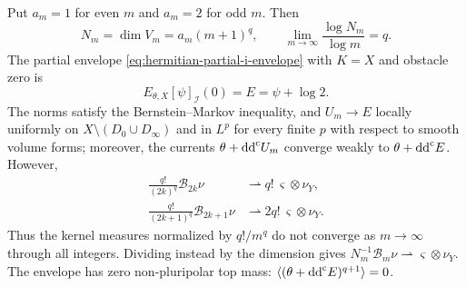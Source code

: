 \begin{theorem}\label{thm:ideal-rounding-kernel-limits}
Put $a_m=1$ for even $m$ and $a_m=2$ for odd $m$. Then
\[
 N_m=\dim V_m=a_m(m+1)^q,\qquad
 \lim_{m\to\infty}\frac{\log N_m}{\log m}=q.
\]
The partial envelope \eqref{eq:hermitian-partial-i-envelope} with $K=X$ and obstacle zero is
\begin{equation}\label{eq:critical-ideal-envelope}
 E_{\theta,X}[\psi]_{\mathcal I}(0)=E=\psi+\log2.
\end{equation}
The norms satisfy the Bernstein--Markov inequality, and $U_m\to E$ locally uniformly
on $X\setminus(D_0\cup D_\infty)$ and in $L^p$ for every finite $p$ with respect to smooth volume forms; moreover, the currents $\theta+\mathrm{dd}^{\mathrm{c}} U_m$ converge weakly to $\theta+\mathrm{dd}^{\mathrm{c}} E$. However,
\begin{align*}
 \frac{q!}{(2k)^q}\mathcal B_{2k}\nu
       &\rightharpoonup q!\,\varsigma\otimes\nu_Y,\\
 \frac{q!}{(2k+1)^q}\mathcal B_{2k+1}\nu
       &\rightharpoonup 2q!\,\varsigma\otimes\nu_Y.
\end{align*}
Thus the kernel measures normalized by $q!/m^q$ do not converge as $m\to\infty$ through all integers. Dividing instead by the dimension gives
$N_m^{-1}\mathcal B_m\nu\rightharpoonup\varsigma\otimes\nu_Y$.
The envelope has zero non-pluripolar top mass:
$\langle(\theta+\mathrm{dd}^{\mathrm{c}} E)^{q+1}\rangle=0$.
\end{theorem}
